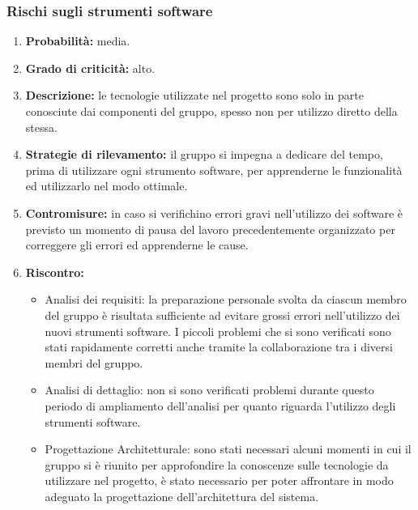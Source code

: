 \subsubsection{Rischi sugli strumenti software}
\begin{enumerate}
	\item \textbf{Probabilità:} media.
	\item \textbf{Grado di criticità:} alto.
	\item \textbf{Descrizione:} le tecnologie utilizzate nel progetto sono solo in parte conosciute dai componenti del gruppo, spesso non per utilizzo diretto della stessa.
	\item \textbf{Strategie di rilevamento:} il gruppo si impegna a dedicare del tempo, prima di utilizzare ogni strumento software, per apprenderne le funzionalità ed utilizzarlo nel modo ottimale.
	\item \textbf{Contromisure:} in caso si verifichino errori gravi nell'utilizzo dei software è previsto un momento di pausa del lavoro precedentemente organizzato per correggere gli errori ed apprenderne le cause.
	\item \textbf{Riscontro:} 
	\begin{itemize}
		\item Analisi dei requisiti: la preparazione personale svolta da ciascun membro del gruppo è risultata sufficiente ad evitare grossi errori nell'utilizzo dei nuovi strumenti software. I piccoli problemi che si sono verificati sono stati rapidamente corretti anche tramite la collaborazione tra i diversi membri del gruppo.
		\item Analisi di dettaglio: non si sono verificati problemi durante questo periodo di ampliamento dell'analisi per quanto riguarda l’utilizzo degli strumenti software.
		\item Progettazione Architetturale: sono stati necessari alcuni momenti in cui il gruppo si è riunito per approfondire la conoscenze sulle tecnologie da utilizzare nel progetto, è stato necessario per poter affrontare in modo adeguato la progettazione dell'architettura del sistema.
	\end{itemize}
\end{enumerate}


